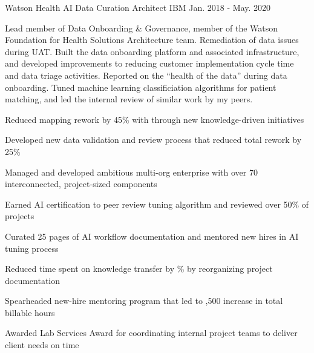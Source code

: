 \begin{cventries}
  \cventry
    {Watson Health} %
    {AI Data Curation Architect} %
    {IBM}
    {Jan. 2018 - May. 2020}
    {
      \begin{cvparagraph}
        Lead member of Data Onboarding \& Governance, member of the Watson Foundation for Health Solutions Architecture team.  Remediation of data issues during UAT.  Built the data onboarding platform and associated infrastructure, and developed improvements to reducing customer implementation cycle time and data triage activities.  Reported on the “health of the data” during data onboarding.  Tuned machine learning classificiation algorithms for patient matching, and led the internal review of similar work by my peers.
      \end{cvparagraph}
      \begin{cvitems} %
        \item {Reduced mapping rework by 45\% with through new knowledge-driven initiatives}
        \item {Developed new data validation and review process that reduced total rework by 25\%}
        \item {Managed and developed ambitious multi-org enterprise with over 70 interconnected, project-sized components}
        \item {Earned AI certification to peer review tuning algorithm and reviewed over 50\% of projects}
        \item {Curated 25 pages of AI workflow documentation and mentored new hires in AI tuning process}
        \item {Reduced time spent on knowledge transfer by \% by reorganizing project documentation}
        \item {Spearheaded new-hire mentoring program that led to ,500 increase in total billable hours}
        \item {Awarded Lab Services Award for coordinating internal project teams to deliver client needs on time}
      \end{cvitems}
    }


\end{cventries}
